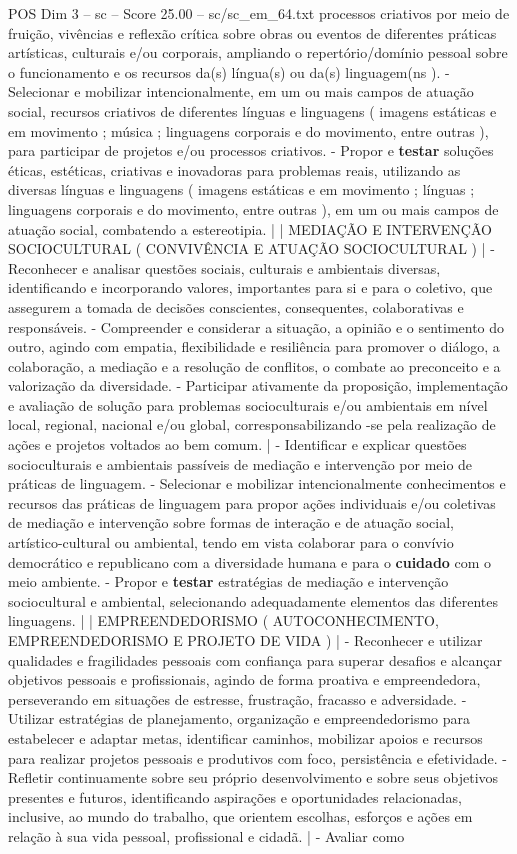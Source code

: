 \begin{textsample}{POS Dim 3 – sc – Score 25.00 – sc/sc\_em\_64.txt}
processos criativos por meio de fruição, vivências e reflexão crítica sobre obras ou eventos de diferentes práticas artísticas, culturais e/ou corporais, ampliando o repertório/domínio pessoal sobre o funcionamento e os recursos da(s) língua(s) ou da(s) linguagem(ns ). - Selecionar e mobilizar intencionalmente, em um ou mais campos de atuação social, recursos criativos de diferentes línguas e linguagens ( imagens estáticas e em movimento ; música ; linguagens corporais e do movimento, entre outras ), para participar de projetos e/ou processos criativos. - Propor e \textbf{testar} soluções éticas, estéticas, criativas e inovadoras para problemas reais, utilizando as diversas línguas e linguagens ( imagens estáticas e em movimento ; línguas ; linguagens corporais e do movimento, entre outras ), em um ou mais campos de atuação social, combatendo a estereotipia. | | MEDIAÇÃO E INTERVENÇÃO SOCIOCULTURAL ( CONVIVÊNCIA E ATUAÇÃO SOCIOCULTURAL ) | - Reconhecer e analisar questões sociais, culturais e ambientais diversas, identificando e incorporando valores, importantes para si e para o coletivo, que assegurem a tomada de decisões conscientes, consequentes, colaborativas e responsáveis. - Compreender e considerar a situação, a opinião e o sentimento do outro, agindo com empatia, flexibilidade e resiliência para promover o diálogo, a colaboração, a mediação e a resolução de conflitos, o combate ao preconceito e a valorização da diversidade. - Participar ativamente da proposição, implementação e avaliação de solução para problemas socioculturais e/ou ambientais em nível local, regional, nacional e/ou global, corresponsabilizando -se pela realização de ações e projetos voltados ao bem comum. | - Identificar e explicar questões socioculturais e ambientais passíveis de mediação e intervenção por meio de práticas de linguagem. - Selecionar e mobilizar intencionalmente conhecimentos e recursos das práticas de linguagem para propor ações individuais e/ou coletivas de mediação e intervenção sobre formas de interação e de atuação social, artístico-cultural ou ambiental, tendo em vista colaborar para o convívio democrático e republicano com a diversidade humana e para o \textbf{cuidado} com o meio ambiente. - Propor e \textbf{testar} estratégias de mediação e intervenção sociocultural e ambiental, selecionando adequadamente elementos das diferentes linguagens. | | EMPREENDEDORISMO ( AUTOCONHECIMENTO, EMPREENDEDORISMO E PROJETO DE VIDA ) | - Reconhecer e utilizar qualidades e fragilidades pessoais com confiança para superar desafios e alcançar objetivos pessoais e profissionais, agindo de forma proativa e empreendedora, perseverando em situações de estresse, frustração, fracasso e adversidade. - Utilizar estratégias de planejamento, organização e empreendedorismo para estabelecer e adaptar metas, identificar caminhos, mobilizar apoios e recursos para realizar projetos pessoais e produtivos com foco, persistência e efetividade. - Refletir continuamente sobre seu próprio desenvolvimento e sobre seus objetivos presentes e futuros, identificando aspirações e oportunidades relacionadas, inclusive, ao mundo do trabalho, que orientem escolhas, esforços e ações em relação à sua vida pessoal, profissional e cidadã. | - Avaliar como 
\end{textsample}
